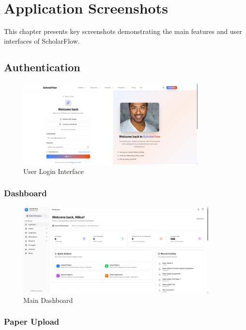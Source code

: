 \chapter{Application Screenshots}
\label{ch:screenshots}

This chapter presents key screenshots demonstrating the main features and user interfaces of ScholarFlow.

\section{Authentication}
\label{sec:auth-screenshots}

\begin{figure}[H]
\centering
\includegraphics[width=0.85\textwidth]{images/screenshots/sign_in.png}
\caption{User Login Interface}
\label{fig:ss-login}
\end{figure}

\subsection{Dashboard}

\begin{figure}[H]
\centering
\includegraphics[width=0.9\textwidth]{images/screenshots/dashboard_overview.png}
\caption{Main Dashboard}
\label{fig:ss-dashboard}
\end{figure}

\subsection{Paper Upload}

